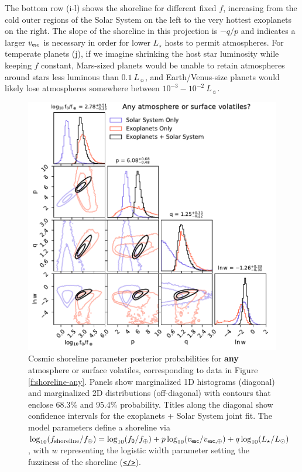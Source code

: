 \documentclass[modern,linenumbers,trackchanges]{aastex7}
\begin{document}
The bottom row (i-l) shows the shoreline for different fixed $f$, increasing from the cold outer regions of the Solar System on the left to the very hottest exoplanets on the right. The slope of the shoreline in this projection is $-q/p$ and indicates a larger $v_{\sf esc}$ is necessary in order for lower $L_\star$ hosts to permit atmospheres. For temperate planets (j), if we imagine shrinking the host star luminosity while keeping $f$ constant, Mars-sized planets would be unable to retain atmospheres around stars less luminous than $0.1~L_\sun$, and Earth/Venus-size planets would likely lose atmospheres somewhere between $10^{-3} - 10^{-2}~L_\sun$.


\begin{figure}[ht!]
\includegraphics[width=\textwidth]{figures/posteriors-any.pdf}
\caption{Cosmic shoreline parameter posterior probabilities for {\bf any} atmosphere or surface volatiles, corresponding to data in Figure \ref{f:shoreline-any}. Panels show marginalized 1D histograms (diagonal) and marginalized 2D distributions (off-diagonal) with contours that enclose 68.3\% and 95.4\% probability. Titles along the diagonal show confidence intervals for the exoplanets + Solar System joint fit. The model parameters define a shoreline via $\log_{10} (f_{\rm shoreline}/f_\oplus) = \log_{10} (f_{\sf 0}/f_\oplus) + p \log_{10} (v_{\sf esc}/v_{\sf esc, \oplus}) + q \log_{10} (L_\star/L_\odot)$, with $w$ representing the logistic width parameter setting the fuzziness of the shoreline  (\href{https://github.com/zkbt/shoreline/blob/main/notebooks/print-and-visualize-posteriors.ipynb}{\texttt{</>}}).}
\label{f:posteriors-any}
\end{figure}
\end{document}
